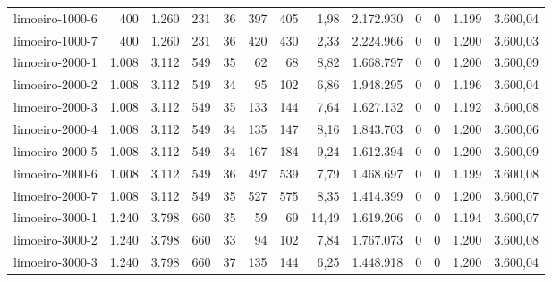 \begin{table}[ht!]
{\begin{tabular}{lrrrrrrrrrrrr}
			\rowcolor{rowlight}limoeiro-1000-6                                                        & 400   & 1.260 & 231 & 36 & 397 & 405 & 1,98  & 2.172.930 & 0 & 0 & 1.199 & 3.600,04 \\
			\rowcolor{rowlight}limoeiro-1000-7                                                        & 400   & 1.260 & 231 & 36 & 420 & 430 & 2,33  & 2.224.966 & 0 & 0 & 1.200 & 3.600,03 \\
			\rowcolor{rowlight}limoeiro-2000-1                                                        & 1.008 & 3.112 & 549 & 35 & 62  & 68  & 8,82  & 1.668.797 & 0 & 0 & 1.200 & 3.600,09 \\
			\rowcolor{rowlight}limoeiro-2000-2                                                        & 1.008 & 3.112 & 549 & 34 & 95  & 102 & 6,86  & 1.948.295 & 0 & 0 & 1.196 & 3.600,04 \\
			\rowcolor{rowlight}limoeiro-2000-3                                                        & 1.008 & 3.112 & 549 & 35 & 133 & 144 & 7,64  & 1.627.132 & 0 & 0 & 1.192 & 3.600,08 \\
			\rowcolor{rowlight}limoeiro-2000-4                                                        & 1.008 & 3.112 & 549 & 34 & 135 & 147 & 8,16  & 1.843.703 & 0 & 0 & 1.200 & 3.600,06 \\
			\rowcolor{rowlight}limoeiro-2000-5                                                        & 1.008 & 3.112 & 549 & 34 & 167 & 184 & 9,24  & 1.612.394 & 0 & 0 & 1.200 & 3.600,09 \\
			\rowcolor{rowlight}limoeiro-2000-6                                                        & 1.008 & 3.112 & 549 & 36 & 497 & 539 & 7,79  & 1.468.697 & 0 & 0 & 1.199 & 3.600,08 \\
			\rowcolor{rowlight}limoeiro-2000-7                                                        & 1.008 & 3.112 & 549 & 35 & 527 & 575 & 8,35  & 1.414.399 & 0 & 0 & 1.200 & 3.600,07 \\
			\rowcolor{rowlight}limoeiro-3000-1                                                        & 1.240 & 3.798 & 660 & 35 & 59  & 69  & 14,49 & 1.619.206 & 0 & 0 & 1.194 & 3.600,07 \\
			\rowcolor{rowlight}limoeiro-3000-2                                                        & 1.240 & 3.798 & 660 & 33 & 94  & 102 & 7,84  & 1.767.073 & 0 & 0 & 1.200 & 3.600,08 \\
			\rowcolor{rowlight}limoeiro-3000-3                                                        & 1.240 & 3.798 & 660 & 37 & 135 & 144 & 6,25  & 1.448.918 & 0 & 0 & 1.200 & 3.600,04 \\

\end{tabular}}
\end{table}
